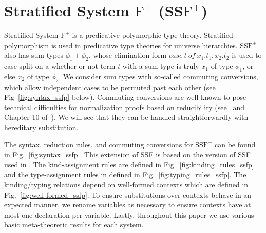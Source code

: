 \newcommand{\ccon}[4]{\mbox{case}\ #1\ \text{of}\ #2\text{.}#3\text{,}#2\text{.}#4}
\newcommand{\rcase}[5]{\mbox{rcase}_{#1}\ #2\ #3\ #4\ #5}
\newcommand{\F}[0]{\mbox{F}^{=}}
\newcommand{\Fp}[0]{\mbox{F}^{+}}
\newcommand{\STLCeq}[0]{\textnormal{STLC}^=}
\newcommand{\A}[0]{\mbox{\textbf{A}}}
\newcommand{\bredto}[0]{\rightsquigarrow_\beta}
\newcommand{\hlmn}[2]{
  \marginpar{
    \small
    {\color{blue}{
        \tiny #2
    }}}
    {\color{red}{
        #1
    }}
}

\section{Stratified System $\Fp$ (SS$\Fp$)}
\label{sec:stratified_system_f_with_sum_types}
Stratified System $\Fp$ is a predicative polymorphic type theory.
Stratified polymorphism is used in predicative type theories for
universe hierarchies.  SS$\Fp$ also has sum types $\phi_1 + \phi_2$,
whose elimination form
$\textit{case}\ t\ \textit{of}\ x_1.t_1,x_2.t_2$ is used to case split
on a whether or not term $t$ with a sum type is truly $x_1$ of type
$\phi_1$, or else $x_2$ of type $\phi_2$.  We consider sum types with
so-called commuting conversions, which allow independent cases to be
permuted past each other (see Fig~\ref{fig:syntax_ssfp}
below).  Commuting conversions are well-known to pose technical
difficulties for normalization proofs based on reducibility
(see~\cite{tatsuta+05} and Chapter 10 of~\cite{Girard:1989}).  We will
see that they can be handled straightforwardly with hereditary
substitution.

The syntax, reduction rules, and commuting conversions for SS$\Fp$ can
be found in Fig.~\ref{fig:syntax_ssfp}.  This extension of SSF is
based on the version of SSF used in \cite{Eades:2010}.  The
kind-assignment rules are defined in Fig.~\ref{fig:kinding_rules_ssfp}
and the type-assignment rules in defined in
Fig.~\ref{fig:typing_rules_ssfp}. The kinding/typing relations
depend on well-formed contexts which are defined in
Fig.~\ref{fig:well-formed_ssfp}.  To ensure substitutions over
contexts behave in an expected manner, we rename variables as
necessary to ensure contexts have at most one declaration per
variable.  Lastly, throughout this paper we use various basic
meta-theoretic results for each system.  

